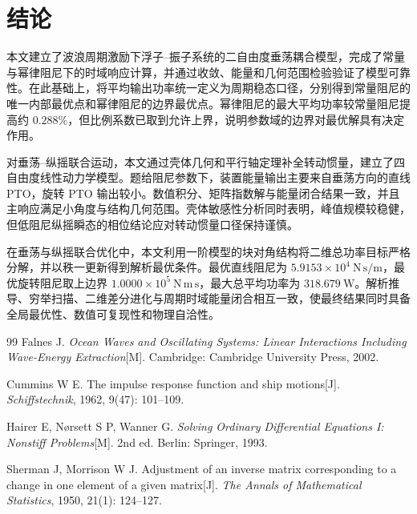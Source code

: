 \documentclass[withoutpreface]{../../../templates/CUMCM2026-Complete-LaTeX/cumcmthesis}
\begin{document}
\section{结论}

本文建立了波浪周期激励下浮子--振子系统的二自由度垂荡耦合模型，完成了常量与幂律阻尼下的时域响应计算，并通过收敛、能量和几何范围检验验证了模型可靠性。在此基础上，将平均输出功率统一定义为周期稳态口径，分别得到常量阻尼的唯一内部最优点和幂律阻尼的边界最优点。幂律阻尼的最大平均功率较常量阻尼提高约 $0.288\%$，但比例系数已取到允许上界，说明参数域的边界对最优解具有决定作用。

对垂荡--纵摇联合运动，本文通过壳体几何和平行轴定理补全转动惯量，建立了四自由度线性动力学模型。题给阻尼参数下，装置能量输出主要来自垂荡方向的直线 PTO，旋转 PTO 输出较小。数值积分、矩阵指数解与能量闭合结果一致，并且主响应满足小角度与结构几何范围。壳体敏感性分析同时表明，峰值规模较稳健，但低阻尼纵摇瞬态的相位结论应对转动惯量口径保持谨慎。

在垂荡与纵摇联合优化中，本文利用一阶模型的块对角结构将二维总功率目标严格分解，并以秩一更新得到解析最优条件。最优直线阻尼为 $5.9153\times10^4\ \mathrm{N\,s/m}$，最优旋转阻尼取上边界 $1.0000\times10^5\ \mathrm{N\,m\,s}$，最大总平均功率为 $318.679\ \mathrm{W}$。解析推导、穷举扫描、二维差分进化与周期时域能量闭合相互一致，使最终结果同时具备全局最优性、数值可复现性和物理自洽性。

\begin{thebibliography}{99}
\small
\setlength{\itemsep}{0.35em}
  Falnes J. \emph{Ocean Waves and Oscillating Systems: Linear Interactions Including Wave-Energy Extraction}[M]. Cambridge: Cambridge University Press, 2002.

  Cummins W E. The impulse response function and ship motions[J]. \emph{Schiffstechnik}, 1962, 9(47): 101--109.

  Hairer E, N{\o}rsett S P, Wanner G. \emph{Solving Ordinary Differential Equations I: Nonstiff Problems}[M]. 2nd ed. Berlin: Springer, 1993.

  Sherman J, Morrison W J. Adjustment of an inverse matrix corresponding to a change in one element of a given matrix[J]. \emph{The Annals of Mathematical Statistics}, 1950, 21(1): 124--127.
\end{thebibliography}
\end{document}
